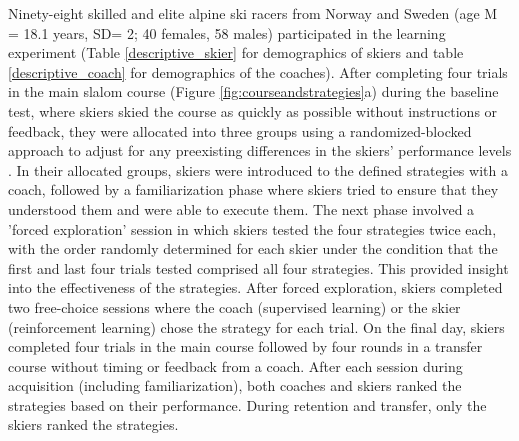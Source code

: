 Ninety-eight skilled and elite alpine ski racers from Norway and Sweden (age M = 18.1 years, SD= 2; 40 females, 58 males) participated in the learning experiment (Table \ref{descriptive_skier} for demographics of skiers and table \ref{descriptive_coach} for demographics of the coaches). After completing four trials in the main slalom course (Figure \ref{fig:courseandstrategies}a) during the baseline test, where skiers skied the course as quickly as possible without instructions or feedback, they were allocated into three groups using a randomized-blocked approach to adjust for any preexisting differences in the skiers' performance levels \cite{maxwell_designing_2017}. In their allocated groups, skiers were introduced to the defined strategies with a coach, followed by a familiarization phase where skiers tried to ensure that they understood them and were able to execute them. The next phase involved a 'forced exploration' session in which skiers tested the four strategies twice each, with the order randomly determined for each skier under the condition that the first and last four trials tested comprised all four strategies. This provided insight into the effectiveness of the strategies. After forced exploration, skiers completed two free-choice sessions where the coach (supervised learning) or the skier (reinforcement learning) chose the strategy for each trial. On the final day, skiers completed four trials in the main course followed by four rounds in a transfer course without timing or feedback from a coach. After each session during acquisition (including familiarization), both coaches and skiers ranked the strategies based on their performance. During retention and transfer, only the skiers ranked the strategies.